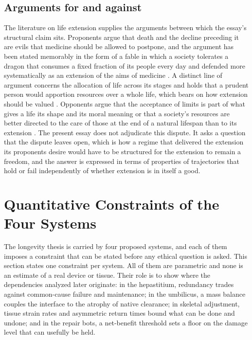 \documentclass[11pt]{article}
\theoremstyle{plain}
\theoremstyle{definition}
\theoremstyle{remark}
\begin{document}
\subsection{Arguments for and against}

The literature on life extension supplies the arguments between which the essay's structural claim sits. Proponents argue that death and the decline preceding it are evils that medicine should be allowed to postpone, and the argument has been stated memorably in the form of a fable in which a society tolerates a dragon that consumes a fixed fraction of its people every day \cite{bostrom2005} and defended more systematically as an extension of the aims of medicine \cite{harris2007}. A distinct line of argument concerns the allocation of life across its stages and holds that a prudent person would apportion resources over a whole life, which bears on how extension should be valued \cite{daniels1988}. Opponents argue that the acceptance of limits is part of what gives a life its shape and its moral meaning \cite{kass2001} or that a society's resources are better directed to the care of those at the end of a natural lifespan than to its extension \cite{callahan1987}. The present essay does not adjudicate this dispute. It asks a question that the dispute leaves open, which is how a regime that delivered the extension its proponents desire would have to be structured for the extension to remain a freedom, and the answer is expressed in terms of properties of trajectories that hold or fail independently of whether extension is in itself a good.

\section{Quantitative Constraints of the Four Systems}\label{sec:subsystems}

The longevity thesis is carried by four proposed systems, and each of them imposes a constraint that can be stated before any ethical question is asked. This section states one constraint per system. All of them are parametric and none is an estimate of a real device or tissue. Their role is to show where the dependencies analyzed later originate: in the hepastitium, redundancy trades against common-cause failure and maintenance; in the umbilicus, a mass balance couples the interface to the atrophy of native clearance; in skeletal adjustment, tissue strain rates and asymmetric return times bound what can be done and undone; and in the repair bots, a net-benefit threshold sets a floor on the damage level that can usefully be held.
\end{document}
